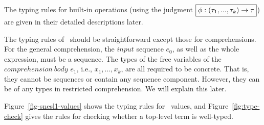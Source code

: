 

The typing rules for built-in operations (using the judgment $\boxed{\phi : (\tau_1,...,\tau_{k}) \rightarrow \tau}$) are given in their detailed descriptions later.


The typing rules of \mysnesl \ should be straightforward except those for comprehensions. 
For the general comprehension, the $input$ sequence $e_0$, as well as the whole expression, must be a sequence.
The types of the free variables of the $ comprehension \ body$ $e_1$, i.e., $x_1,...,x_k$, are all required to be concrete. 
That is, they cannot be sequences or contain any sequence component.
However, they can be of any types in restricted comprehension.
We will explain this later.
 
 
Figure~\ref{fig-snesl1-values} shows the typing rules for \mysnesl \ values, and Figure~\ref{fig:type-check} gives the rules for checking whether a top-level term is well-typed.

